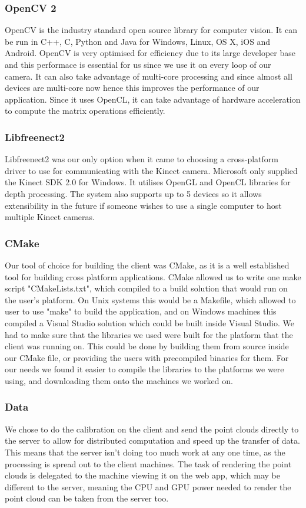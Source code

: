 \documentclass{article}
\begin{document}
\subsubsection{OpenCV 2}
OpenCV is the industry standard open source library for computer vision. It can be run in C++, C, Python and Java for Windows, Linux, OS X, iOS and Android. OpenCV is very optimised for efficiency due to its large developer base and this performace is essential for us since we use it on every loop of our camera. It can also take advantage of multi-core processing and since almost all devices are multi-core now hence this improves the performance of our application. Since it uses OpenCL, it can take advantage of hardware acceleration to compute the matrix operations efficiently.
\subsubsection{Libfreenect2}
Libfreenect2 was our only option when it came to choosing a cross-platform driver to use for communicating with the Kinect camera. Microsoft only supplied the Kinect SDK 2.0 for Windows. It utilises OpenGL and OpenCL libraries for depth processing. The system also supports up to 5 devices so it allows extensibility in the future if someone wishes to use a single computer to host multiple Kinect cameras.
\subsubsection{CMake}
Our tool of choice for building the client was CMake, as it is a well established tool for building cross platform applications. CMake allowed us to write one make script "CMakeLists.txt", which compiled to a build solution that would run on the user's platform. On Unix systems this would be a Makefile, which allowed to user to use "make" to build the application, and on Windows machines this compiled a Visual Studio solution which could be built inside Visual Studio. We had to make sure that the libraries we used were built for the platform that the client was running on. This could be done by building them from source inside our CMake file, or providing the users with precompiled binaries for them. For our needs we found it easier to compile the libraries to the platforms we were using, and downloading them onto the machines we worked on. 
\subsubsection{Data}
We chose to do the calibration on the client and send the point clouds directly to the server to allow for distributed computation and speed up the transfer of data. This means that the server isn't doing too much work at any one time, as the processing is spread out to the client machines. The task of rendering the point clouds is delegated to the machine viewing it on the web app, which may be different to the server, meaning the CPU and GPU power needed to render the point cloud can be taken from the server too.
\end{document}
